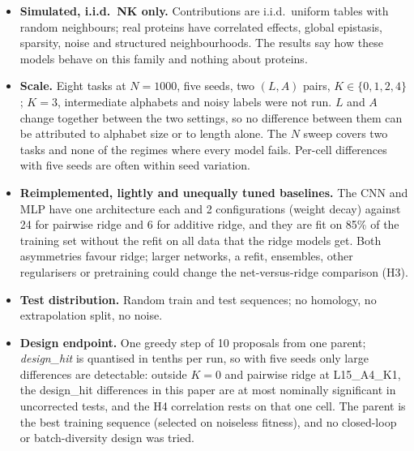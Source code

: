 \begin{itemize}
\item \textbf{Simulated, i.i.d.\ NK only.} Contributions are i.i.d.\ uniform tables with random neighbours; real proteins have correlated effects, global epistasis, sparsity, noise and structured neighbourhoods. The results say how these models behave on this family and nothing about proteins.
\item \textbf{Scale.} Eight tasks at $N=1000$, five seeds, two $(L,A)$ pairs, $K\in\{0,1,2,4\}$; $K=3$, intermediate alphabets and noisy labels were not run. $L$ and $A$ change together between the two settings, so no difference between them can be attributed to alphabet size or to length alone. The $N$ sweep covers two tasks and none of the regimes where every model fails. Per-cell differences with five seeds are often within seed variation.
\item \textbf{Reimplemented, lightly and unequally tuned baselines.} The CNN and MLP have one architecture each and 2 configurations (weight decay) against 24 for pairwise ridge and 6 for additive ridge, and they are fit on 85\% of the training set without the refit on all data that the ridge models get. Both asymmetries favour ridge; larger networks, a refit, ensembles, other regularisers or pretraining could change the net-versus-ridge comparison (H3).
\item \textbf{Test distribution.} Random train and test sequences; no homology, no extrapolation split, no noise.
\item \textbf{Design endpoint.} One greedy step of 10 proposals from one parent; \emph{design\_hit} is quantised in tenths per run, so with five seeds only large differences are detectable: outside $K=0$ and pairwise ridge at L15\_A4\_K1, the design\_hit differences in this paper are at most nominally significant in uncorrected tests, and the H4 correlation rests on that one cell. The parent is the best training sequence (selected on noiseless fitness), and no closed-loop or batch-diversity design was tried.
\end{itemize}
